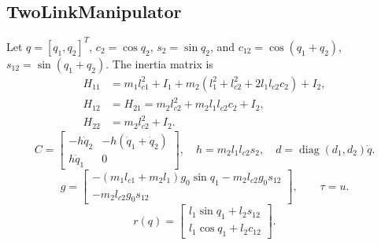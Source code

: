 \documentclass[11pt]{article}
\newcommand{\diag}{\operatorname{diag}}
\begin{document}
\subsection{TwoLinkManipulator}
Let \(q=[q_1,q_2]^T\), \(c_2=\cos q_2\), \(s_2=\sin q_2\), and
\(c_{12}=\cos(q_1+q_2)\), \(s_{12}=\sin(q_1+q_2)\).  The inertia matrix is
\begin{align}
    H_{11} &= m_1l_{c1}^2+I_1
      +m_2(l_1^2+l_{c2}^2+2l_1l_{c2}c_2)+I_2,\\
    H_{12} &= H_{21}=m_2l_{c2}^2+m_2l_1l_{c2}c_2+I_2,\\
    H_{22} &= m_2l_{c2}^2+I_2.
\end{align}
\begin{equation}
    C=
    \begin{bmatrix}
        -h\dot q_2&-h(\dot q_1+\dot q_2)\\
        h\dot q_1&0
    \end{bmatrix},
    \quad
    h=m_2l_1l_{c2}s_2,
    \quad
    d=\diag(d_1,d_2)\dot q.
\end{equation}
\begin{equation}
    g=
    \begin{bmatrix}
        -(m_1l_{c1}+m_2l_1)g_0\sin q_1-m_2l_{c2}g_0s_{12}\\
        -m_2l_{c2}g_0s_{12}
    \end{bmatrix},
    \qquad
    \tau=u.
\end{equation}
\begin{equation}
    r(q)=
    \begin{bmatrix}
        l_1\sin q_1+l_2s_{12}\\
        l_1\cos q_1+l_2c_{12}
    \end{bmatrix}.
\end{equation}
\end{document}
